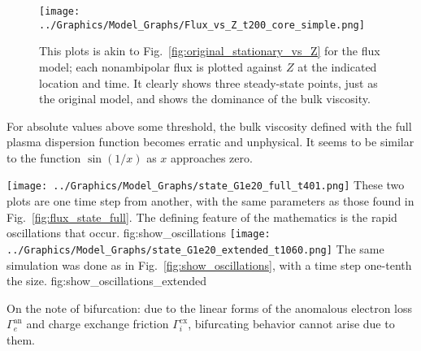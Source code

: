 \begin{figure}[htb] %
	\centering
	\texttt{[image: ../Graphics/Model\_Graphs/Flux\_vs\_Z\_t200\_core\_simple.png]}
	\caption{This plots is akin to Fig.~\ref{fig:original_stationary_vs_Z} for the flux model; each nonambipolar flux is plotted against $Z$ at the indicated location and time.
	It clearly shows three steady-state points, just as the original model, and shows the dominance of the bulk viscosity.}
\end{figure}
For absolute values above some threshold, the bulk viscosity defined with the full plasma dispersion function becomes erratic and unphysical.
It seems to be similar to the function $\sin(1/x)$ as $x$ approaches zero.

	{\texttt{[image: ../Graphics/Model\_Graphs/state\_G1e20\_full\_t401.png]}}
	{These two plots are one time step from another, with the same parameters as those found in Fig.~\ref{fig:flux_state_full}.
	The defining feature of the mathematics is the rapid oscillations that occur.}
	{fig:show_oscillations}
	{\texttt{[image: ../Graphics/Model\_Graphs/state\_G1e20\_extended\_t1060.png]}}
	{The same simulation was done as in Fig.~\ref{fig:show_oscillations}, with a time step one-tenth the size.}
	{fig:show_oscillations_extended}

On the note of bifurcation: due to the linear forms of the anomalous electron loss $\Gamma_e^\text{an}$ and charge exchange friction $\Gamma_i^\text{cx}$, bifurcating behavior cannot arise due to them.

